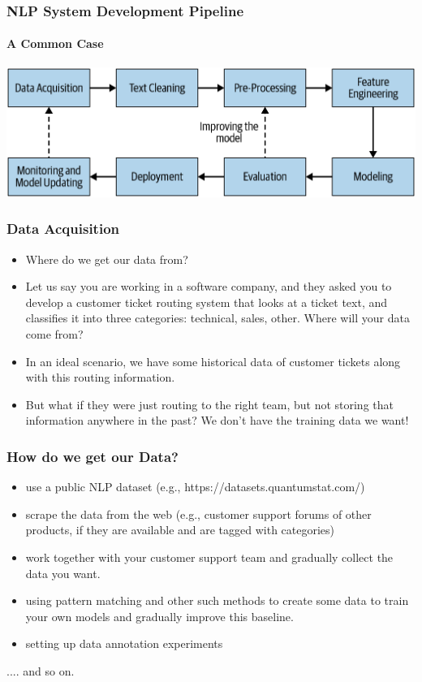 \documentclass{beamer}
\begin{document}
\begin{frame}
\frametitle{NLP System Development Pipeline}
\framesubtitle{A Common Case}
\includegraphics[width=\textwidth]{figures/pipeline.png}
\end{frame}

\begin{frame}
\frametitle{Data Acquisition}
\begin{itemize}
    \item Where do we get our data from? \pause
    \item Let us say you are working in a software company, and they asked you to develop a customer ticket routing system that looks at a ticket text, and classifies it into three categories: technical, sales, other. Where will your data come from?
    \pause \item In an ideal scenario, we have some historical data of customer tickets along with this routing information.
    \item But what if they were just routing to the right team, but not storing that information anywhere in the past? We don't have the training data we want!
\end{itemize}
\end{frame}

\begin{frame}
\frametitle{How do we get our Data?}
\begin{itemize}
    \item use a public NLP dataset (e.g., https://datasets.quantumstat.com/) \pause
    \item scrape the data from the web (e.g., customer support forums of other products, if they are available and are tagged with categories)
    \item work together with your customer support team and gradually collect the data you want. 
    \item using pattern matching and other such methods to create some data to train your own models and gradually improve this baseline. 
    \item setting up data annotation experiments
\end{itemize}
.... and so on. 
\end{frame}
\end{document}
